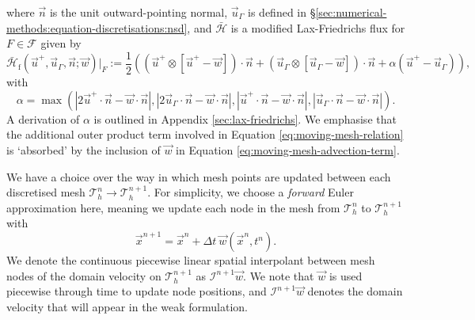             where $\vec{n}$ is the unit outward-pointing normal, $\vec{u}_\Gamma$ is defined in \S\ref{sec:numerical-methods:equation-discretisations:nsd}, and $\bar{\mathcal{H}}$ is a modified Lax-Friedrichs flux for $F \in \mathcal{F}$ given by
            \begin{equation}
                \bar{\mathcal{H}}_\text{f}(\vec{u}^+, \vec{u}_\Gamma, \vec{n}; \vec{w})|_F := \frac{1}{2} ((\vec{u}^+ \otimes [\vec{u}^+ - \vec{w}]) \cdot \vec{n} + (\vec{u}_\Gamma \otimes [\vec{u}_\Gamma - \vec{w}]) \cdot \vec{n} + \alpha(\vec{u}^+ - \vec{u}_\Gamma)),
                \label{eq:lax-friedrichs-modified}
            \end{equation}
            with
            \begin{equation}
                \alpha = \max(|2\vec{u}^+\cdot\vec{n} - \vec{w} \cdot \vec{n}|, |2\vec{u}_\Gamma\cdot\vec{n} - \vec{w} \cdot \vec{n}|, |\vec{u}^+ \cdot \vec{n} - \vec{w} \cdot \vec{n}|, |\vec{u}_\Gamma \cdot \vec{n} - \vec{w} \cdot \vec{n}|).
                \label{eq:lf-alpha-velocity}
            \end{equation}
            A derivation of $\alpha$ is outlined in Appendix \ref{sec:lax-friedrichs}. We emphasise that the additional outer product term involved in Equation \eqref{eq:moving-mesh-relation} is `absorbed' by the inclusion of $\vec{w}$ in Equation \eqref{eq:moving-mesh-advection-term}.


            We have a choice over the way in which mesh points are updated between each discretised mesh $\mathcal{T}_h^n \rightarrow \mathcal{T}_h^{n+1}$. For simplicity, we choose a \textit{forward} Euler approximation here, meaning we update each node in the mesh from $\mathcal{T}^n_h$ to $\mathcal{T}^{n+1}_h$ with
            \begin{equation}
                \vec{x}^{n+1} = \vec{x}^n + \Delta t ~ \vec{w}(\vec{x}^n, t^n).
                \label{eq:forward-euler-position}
            \end{equation}
            We denote the continuous piecewise linear spatial interpolant between mesh nodes of the domain velocity on $\mathcal{T}^{n+1}_h$ as $\mathcal{I}^{n+1}\vec{w}$. We note that $\vec{w}$ is used piecewise through time to update node positions, and $\mathcal{I}^{n+1}\vec{w}$ denotes the domain velocity that will appear in the weak formulation.

